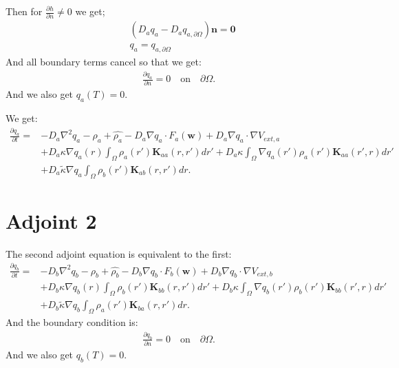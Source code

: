 \documentclass[11pt, a4paper]{article}
\theoremstyle{definition}
\newcommand{\adja}{q_a}
\newcommand{\adjb}{q_b}
\newcommand{\adjaB}{q_{a,\partial \Omega}}
\newcommand{\ra}{\rho_a}
\newcommand{\rb}{\rho_b}
\newcommand{\w}{\mathbf{w}}
\newcommand{\n}{\mathbf{n}}
\newcommand{\K}{\mathbf{K}}
\begin{document}
	Then for $\frac{\partial h}{\partial n} \neq 0$ we get;
	\begin{align*}
	&(D_a \adja - D_a \adjaB) \n = \mathbf 0\\
	&\adja = \adjaB
	\end{align*}
	And all boundary terms cancel so that we get:
	\begin{align*}
	\frac{\partial \adja}{\partial n} = 0 \quad \text{on} \quad \partial \Omega.
	\end{align*}
	And we also get $\adja(T) = 0$.
	
	We get:
	\begin{align*}
	\frac{\partial \adja}{\partial t} = &- D_a\nabla^2\adja - \ra + \widehat{\ra}    - D_a\nabla \adja \cdot F_a(\w) + D_a \nabla \adja \cdot  \nabla V_{ext,a} \\
	&+ D_a\kappa \nabla \adja(r) \int_\Omega \ra (r') \K_{aa}(r,r')dr' + D_a\kappa \int_\Omega \nabla \adja(r') \ra (r') \K_{aa}(r',r)dr' \\
	& + D_a \tilde{\kappa} \nabla \adja \int_\Omega  \rb (r') \K_{ab} (r,r')dr.
	\end{align*}
	\section{Adjoint 2}
	The second adjoint equation is equivalent to the first:
	\begin{align*}
	\frac{\partial \adjb}{\partial t} = &- D_b\nabla^2\adjb - \rb + \widehat{\rb}    - D_b\nabla \adjb \cdot F_b(\w) + D_b \nabla \adjb \cdot  \nabla V_{ext,b} \\
	&+ D_b\kappa \nabla \adjb(r) \int_\Omega \rb (r') \K_{bb}(r,r')dr' + D_b\kappa \int_\Omega \nabla \adjb(r') \rb (r') \K_{bb}(r',r)dr' \\
	& + D_b \tilde{\kappa} \nabla \adjb \int_\Omega  \ra (r') \K_{ba} (r,r')dr.
	\end{align*}
	And the boundary condition is:
	\begin{align*}
	\frac{\partial \adjb}{\partial n} = 0 \quad \text{on} \quad \partial \Omega.
	\end{align*} 
	And we also get $\adjb(T) = 0$.
	
\end{document}
